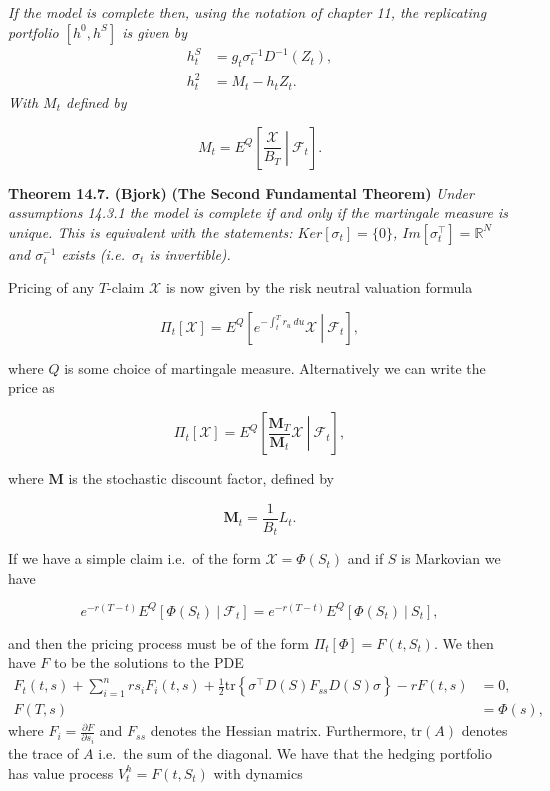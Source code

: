 \documentclass[a4paper,10pt,openany]{book}
\begin{document}
\emph{If the model is complete then, using the notation of chapter 11, the replicating portfolio \([h^0,h^S]\) is given by}
\begin{align*}
h_t^S&=g_t\sigma_t^{-1}D^{-1}(Z_t),\tag{14.24}\\
h_t^2&=M_t-h_tZ_t.\tag{14.25}
\end{align*}
\emph{With \(M_t\) defined by}

\[
M_t=E^Q\left[\left. \frac{\mathcal{X}}{B_T}\ \right\vert\ \mathcal{F}_t \right].\tag{14.17}
\]

\textbf{Theorem 14.7. (Bjork)} \textbf{(The Second Fundamental Theorem)} \emph{Under assumptions 14.3.1 the model is complete if and only if the martingale measure is unique. This is equivalent with the statements: \(Ker[\sigma_t]=\{0\}\), \(Im[\sigma_t^\top]=\mathbb{R}^N\) and \(\sigma_t^{-1}\) exists (i.e.~\(\sigma_t\) is invertible).}

Pricing of any \(T\)-claim \(\mathcal{X}\) is now given by the risk neutral valuation formula

\[
\Pi_t[\mathcal{X}] = E^Q\left[\left. e^{-\int_t^Tr_u\ du}\mathcal{X} \ \right\vert\ \mathcal{F}_t\right],\tag{14.27}
\]

where \(Q\) is some choice of martingale measure. Alternatively we can write the price as

\[
\Pi_t[\mathcal{X}] = E^Q\left[\left. \frac{\mathbf{M}_T}{\mathbf{M}_t}\mathcal{X} \ \right\vert\ \mathcal{F}_t\right],\tag{14.29}
\]

where \(\mathbf{M}\) is the stochastic discount factor, defined by

\[
\mathbf{M}_t=\frac{1}{B_t}L_t.
\]

If we have a simple claim i.e.~of the form \(\mathcal{X}=\Phi(S_t)\) and if \(S\) is Markovian we have

\[
e^{-r(T-t)}E^Q[\Phi(S_t)\ \vert\ \mathcal{F}_t]=e^{-r(T-t)}E^Q[\Phi(S_t)\ \vert\ S_t],
\]

and then the pricing process must be of the form \(\Pi_t[\Phi]=F(t,S_t)\). We then have \(F\) to be the solutions to the PDE
\begin{align*}
F_t(t,s)+\sum_{i=1}^nrs_iF_i(t,s)+\frac{1}{2}\text{tr}\left\{\sigma^\top D(S)F_{ss}D(S)\sigma\right\}-rF(t,s)&=0,\tag{14.31}\\
F(T,s)&=\Phi(s),\tag{14.31}
\end{align*}
where \(F_i=\frac{\partial F}{\partial s_i}\) and \(F_{ss}\) denotes the Hessian matrix. Furthermore, \(\text{tr}(A)\) denotes the trace of \(A\) i.e.~the sum of the diagonal. We have that the hedging portfolio has value process \(V_t^h=F(t,S_t)\) with dynamics
\end{document}
